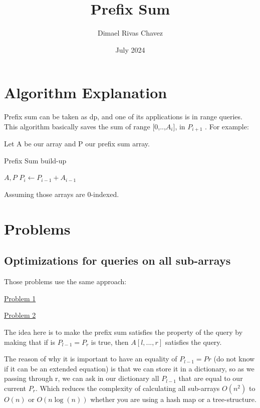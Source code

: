 \documentclass[10pt,a4paper]{article}
\title{Prefix Sum}
\author{Dimael Rivas Chavez}
\date{July 2024}
\begin{document}
	\maketitle
	\section{Algorithm Explanation}
	Prefix sum can be taken as dp, and one of its applications is in range queries. This algorithm basically saves the sum of range [0,..,$A_i$], in $P_{i+1}$ .
	For example:
	
	Let A be our array and P our prefix sum array.
	
	\begin{algorithm}
		\begin{algorithmic}[0]
			\caption{Prefix Sum build-up}
			\Require $A, P$
				\State $P_i \gets P_{i-1} + A_{i-1}$
			\EndFor
		\end{algorithmic}
	\end{algorithm}
	Assuming those arrays are 0-indexed.
	
	\section{Problems}
	\subsection{Optimizations for queries on all sub-arrays}
	Those problems use the same approach:
	
	\href{https://codeforces.com/problemset/problem/1398/C}{Problem 1}
	
	\href{https://codeforces.com/problemset/problem/1996/E}{Problem 2}
	
	The idea here is to make the prefix sum satisfies the property of the query by making that if is $P_{l-1} = P_r$ is true, then $A[l,...,r]$ satisfies the query.
	
	The reason of why it is important to have an equality of $P_{l-1} = P{r}$ (do not know if it can be an extended equation) is that we can store it in a dictionary, so as we passing through r, we can ask in our dictionary all $P_{l-1}$ that are equal to our current $P_r$. Which reduces the complexity of calculating all sub-arrays $O(n^2)$ to $O(n)$ or $O(n\log(n))$ whether you are using a hash map or a tree-structure.
	
	
	
\end{document}
